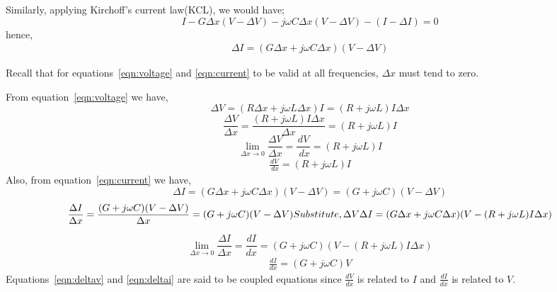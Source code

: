 Similarly, applying Kirchoff's current law(KCL), we would have;
\begin{dmath*}
I  - G\Delta x (V - \Delta V) - j\omega C\Delta x (V - \Delta V) - (I - \Delta I) = 0
\end{dmath*}
hence,
\begin{align}
\Delta I = (G \Delta x + j \omega C \Delta x) (V - \Delta V)
\label{eqn:current}
\end{align}

Recall that for equations~\eqref{eqn:voltage} and \eqref{eqn:current} to be valid at all frequencies, $\Delta x$ must tend to zero.

From equation~\eqref{eqn:voltage} we have,
\begin{dmath*}
\Delta V =  (R \Delta x + j\omega L\Delta x)I = (R + j\omega L)I\Delta x
\end{dmath*}
\begin{dmath*}
\frac{\Delta V }{\Delta x} = \frac{  (R  + j\omega L)I\Delta x}{\Delta x} =  (R  + j\omega L) I
\end{dmath*}
\[ \lim_{ \Delta x\to 0} \frac{\Delta V}{ \Delta x} = \frac{ dV}{ \ dx} =  (R + j \omega L)I \]
\begin{align}
\frac{ dV}{ \ dx} =  (R + j \omega L)I 
\label{eqn:deltav}
\end{align} 
Also, from equation~\eqref{eqn:current} we have,
\begin{dmath*}
\Delta I =  (G \Delta x + j\omega C\Delta x) (V - \Delta V) =  (G + j\omega C)(V - \Delta V)
\end{dmath*}
\begin{dmath*}
\frac{	\Delta I }{\Delta x} = \frac{  (G + j\omega C)(V - \Delta V)}{\Delta x} =   (G + j\omega C) (V - \Delta V)
\newline
\newline
Substitute, \Delta V 
\newline
\newline
\Delta I = (G\Delta x + j\omega C\Delta x)(V -  (R + j\omega L)I\Delta x)
\end{dmath*}




\[ \lim_{ \Delta x\to 0}	\frac{ \Delta I}{ \Delta x} = \frac{dI}{dx} =  (G + j\omega C)(V -  (R + j\omega L)I\Delta x) \]
\begin{align}
\frac{dI}{dx} =  (G + j\omega C)V 
\label{eqn:deltai}
\end{align}
Equations~\eqref{eqn:deltav} and \eqref{eqn:deltai} are said to be coupled equations since $ \frac{dV}{dx} $ is related to $I$ and $ \frac{dI}{dx} $  is related to $V$.

